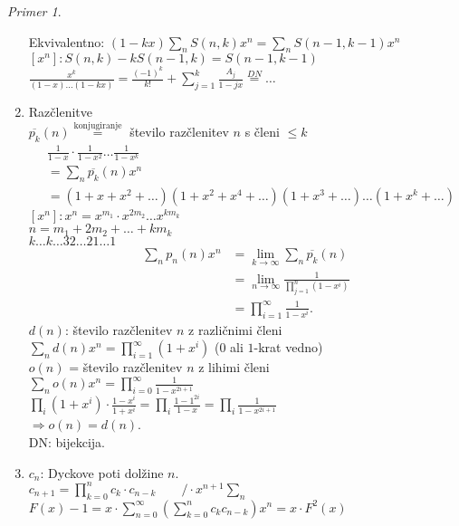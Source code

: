 \documentclass[a4paper, 12pt]{book}
\theoremstyle{definition}
\theoremstyle{remark}
\newtheorem*{ex}{Primer}
\begin{document}
\begin{ex}
\begin{enumerate}[label=(\arabic*)]
      Ekvivalentno: $(1-kx) \sum_n S(n,k) x^n = \sum_n S(n-1, k-1) x^n$ \\
      $[x^n]: S(n,k) - k S(n-1,k) = S(n-1, k-1)$ \\
      $\frac{x^k}{(1-x) \dots (1-kx)} = \frac{(-1)^k}{k!} + \sum_{j=1}^{k} \frac{A_j}{1-jx} \stackrel{DN}{=} \dots$
    \item Razčlenitve \\
      $\overline{p_k}(n) \stackrel{\text{konjugiranje}}{=}$ število razčlenitev $n$ s členi $\leq k$ \\
      \begin{align*}
        &\frac{1}{1-x} \cdot \frac{1}{1-x^2} \dots \frac{1}{1-x^k} \\
        &= \sum_n \overline{p_k}(n) x^n \\
        &= (1+x+x^2+\dots) (1+x^2+x^4+\dots) (1+x^3+\dots) \dots (1+x^k+\dots)
      \end{align*}
      $[x^n]: x^n = x^{m_1} \cdot x^{2 m_2} \dots x^{k m_k}$ \\
      $n = m_1 + 2 m_2 + \dots + k m_k$ \\
      $k \dots k \dots 3 2 \dots 2 1 \dots 1$ %
      \begin{align*}
        \sum_n p_n(n) x^n &= \lim_{k \to \infty} \sum_n \overline{p_k}(n) \\
        &= \lim_{n \to \infty} \frac{1}{\prod_{j=1}^{n} (1-x^i)} \\
        &= \prod_{i=1}^{\infty} \frac{1}{1-x^i}.
      \end{align*}
      $d(n)$: število razčlenitev $n$ z različnimi členi \\
      $\sum_n d(n) x^n = \prod_{i=1}^{\infty} (1+x^i)$ ($0$ ali $1$-krat vedno) \\
      $o(n)$ = število razčlenitev $n$ z lihimi členi \\
      $\sum_n o(n) x^n = \prod_{i=0}^{\infty} \frac{1}{1-x^{2i + 1}}$ \\
      $\prod_i (1+x^i) \cdot \frac{1-x^i}{1+x^i} = \prod_{i} \frac{1-1^{2i}}{1-x} = \prod_i \frac{1}{1-x^{2i+1}}$ \\
      $\Longrightarrow o(n) = d(n)$. \\
      DN: bijekcija.
    \item $c_n$: Dyckove poti dolžine $n$. \\
      $c_{n+1} = \prod_{k=0}^n c_k \cdot c_{n-k} \qquad / \cdot x^{n+1} \sum_n$ \\
      $F(x) - 1 = x \cdot \sum_{n=0}^{\infty} \left(\sum_{k=0}^{n} c_k c_{n-k}\right) x^n = x \cdot F^2(x)$ \\

\end{enumerate}
\end{ex}
\end{document}
